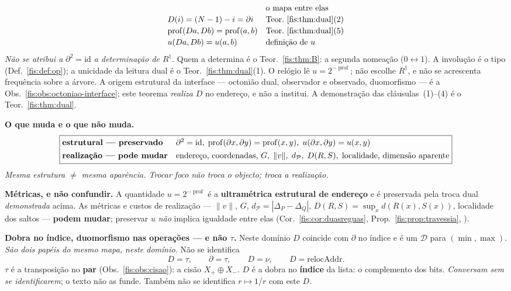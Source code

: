 \documentclass[livro.tex]{subfiles}
\begin{document}
\begin{teorema}
\[\begin{array}{@{}ll@{}}
  & \text{o mapa entre elas}\\[2pt]
D(i)=(N-1)-i=\partial i
  & \text{Teor.~\ref{fis:thm:dual}(2)}\\[2pt]
\operatorname{prof}(Da,Db)=\operatorname{prof}(a,b)
  & \text{Teor.~\ref{fis:thm:dual}(5)}\\[2pt]
u(Da,Db)=u(a,b)
  & \text{definição de }u
\end{array}
\]
\emph{Não se atribui a $\partial^{2}=\mathrm{id}$ a determinação de $R^{\dagger}$.}
Quem a determina é o Teor.~\ref{fis:thm:B}: a segunda nomeação ($0\leftrightarrow 1$).
A involução é o tipo (Def.~\ref{fis:def:op}); a unicidade da leitura dual é o
Teor.~\ref{fis:thm:dual}(1). O relógio lê $u=2^{-\operatorname{prof}}$; não escolhe
$R^{\dagger}$, e não se acrescenta frequência sobre a árvore.
A origem estrutural da interface --- octonião dual, observador e observado,
duomorfismo --- é a Obs.~\ref{fis:obs:octoniao-interface}; este teorema
\emph{realiza} $D$ no endereço, e não a institui.
A demonstração das cláusulas~(1)--(4) é o Teor.~\ref{fis:thm:dual}.

\medskip\noindent\textbf{O que muda e o que não muda.}
\[
\boxed{
\begin{array}{@{}l@{\quad}l@{}}
\textbf{estrutural --- preservado} & \partial^{2}=\mathrm{id},\;
\operatorname{prof}(\partial x,\partial y)=\operatorname{prof}(x,y),\;
u(\partial x,\partial y)=u(x,y)\\[4pt]
\textbf{realização --- pode mudar} & \text{endereço, coordenadas, }G,\;
\|v\|,\;d_{\mathcal{P}},\;D(R,S),\;\text{localidade, dimensão aparente}
\end{array}}
\]
\emph{Mesma estrutura $\neq$ mesma aparência. Trocar foco não troca o objecto;
troca a realização.}

\medskip\noindent\textbf{Métricas, e não confundir.} A quantidade
$u=2^{-\operatorname{prof}}$ é a \textbf{ultramétrica estrutural de endereço} e
é preservada pela troca dual \emph{demonstrada} acima. As métricas e custos de
realização --- $\|v\|$, $G$, $d_{\mathcal{P}}=|\Delta_P-\Delta_Q|$,
$D(R,S)=\sup_x d(R(x),S(x))$, localidade dos saltos --- \textbf{podem mudar};
preservar $u$ \emph{não} implica igualdade entre elas
(Cor.~\ref{fis:cor:duasreguas}, Prop.~\ref{fis:prop:travessia},
).

\medskip\noindent\textbf{Dobra no índice, duomorfismo nas operações --- e não
$\tau$.} Neste domínio $D$ coincide com $\partial$ no índice e é um
$\mathcal{D}$ para $(\min,\max)$. \emph{São dois papéis do mesmo mapa, neste
domínio.} Não se identifica
\[
D=\tau,\qquad \partial=\tau,\qquad D=\nu,\qquad D=\mathrm{relocAddr}.
\]
$\tau$ é a transposição no \textbf{par} (Obs.~\ref{fis:obs:cisao}): a cisão
$X_{+}\oplus X_{-}$. $D$ é a dobra no \textbf{índice} da lista: o complemento
dos bits. \emph{Conversam sem se identificarem}; o texto não as funde. Também
não se identifica $r\mapsto1/r$ com este $D$.


\end{teorema}
\end{document}
